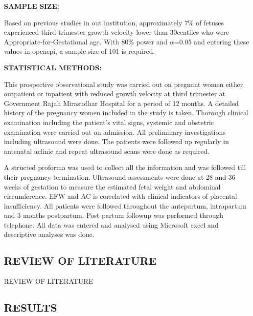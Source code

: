 \documentclass[14pt]{extarticle}
\begin{document}
\textbf{\large SAMPLE SIZE:}

Based on previous studies in out institution, approximately 7\% of fetuses experienced third trimester growth velocity lower than 30centiles who were Appropriate-for-Gestational age. With 80\% power and $\alpha$=0.05 and entering these values in openepi, a sample size of 101 is required. 

\textbf{\large STATISTICAL METHODS:}

This prospective observational study was carried out on pregnant women either outpatient or inpatient with reduced growth velocity at third trimester at Government Rajah Mirasudhar Hospital for a period of 12 months. A detailed history of the pregnancy women included in the study is taken. Thorough clinical examination including the patient's vital signs, systemic and obstetric examination were carried out on admission. All preliminary investigations including ultrasound were done. The patients were followed up regularly in antenatal aclinic and repeat ultrasound scans were done as required.

A structed proforma was used to collect all the information and was followed till their pregnancy termination. Ultrasound assessments were done at 28 and 36 weeks of gestation to measure the estimated fetal weight and abdominal circumference. EFW and AC is correlated with clinical indicators of placental insufficiency. All patients were followed throughout the antepartum, intrapartum and 3 months postpartum. Post partum followup was performed through telephone. All data was entered and analysed using Microsoft excel and descriptive analyses was done.

\newpage
\null
\vfill
\begin{flushright}
    \section{REVIEW OF LITERATURE}
\end{flushright}
\hrulefill
\newpage


REVIEW OF LITERATURE

\newpage
\null
\vfill
\begin{flushright}
    \section{RESULTS}
\end{flushright}
\hrulefill
\newpage



\clearpage
\end{document}
